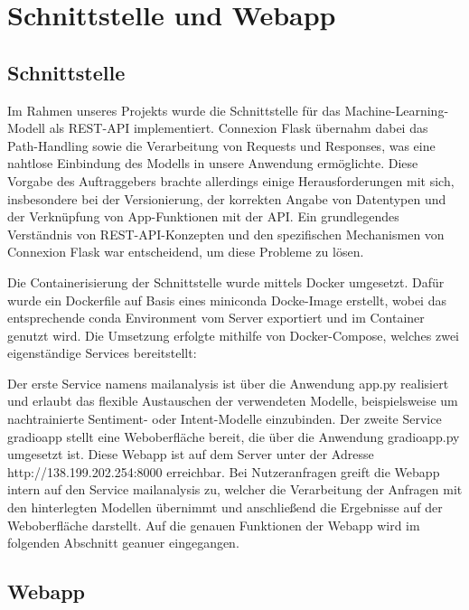 \newpage
\section{Schnittstelle und Webapp}

\subsection{Schnittstelle}

Im Rahmen unseres Projekts wurde die Schnittstelle für das Machine-Learning-Modell als REST-API implementiert.
Connexion Flask übernahm dabei das Path-Handling sowie die Verarbeitung von Requests und Responses, was eine
nahtlose Einbindung des Modells in unsere Anwendung ermöglichte. Diese Vorgabe des Auftraggebers brachte
allerdings einige Herausforderungen mit sich, insbesondere bei der Versionierung, der korrekten Angabe
von Datentypen und der Verknüpfung von App-Funktionen mit der API. Ein grundlegendes Verständnis von
REST-API-Konzepten und den spezifischen Mechanismen von Connexion Flask war entscheidend, um diese Probleme
zu lösen. 

Die Containerisierung der Schnittstelle wurde mittels Docker umgesetzt. Dafür wurde ein
Dockerfile auf Basis eines miniconda Docke-Image erstellt, wobei das entsprechende conda
Environment vom Server exportiert und im Container genutzt wird. Die Umsetzung erfolgte mithilfe
von Docker-Compose, welches zwei eigenständige Services bereitstellt: 

Der erste Service namens mail\textunderscore analysis ist über die Anwendung app.py realisiert und erlaubt
das flexible Austauschen der verwendeten Modelle, beispielsweise um nachtrainierte Sentiment-
oder Intent-Modelle einzubinden. Der zweite Service gradio\textunderscore app stellt eine Weboberfläche bereit,
die über die Anwendung gradio\textunderscore app.py umgesetzt ist. Diese Webapp ist auf dem Server unter der
Adresse http://138.199.202.254:8000 erreichbar. Bei Nutzeranfragen greift die Webapp intern
auf den Service mail\textunderscore analysis zu, welcher die Verarbeitung der Anfragen mit den hinterlegten
Modellen übernimmt und anschließend die Ergebnisse auf der Weboberfläche darstellt. Auf die genauen Funktionen der 
Webapp wird im folgenden Abschnitt geanuer eingegangen. 

\subsection{Webapp}

